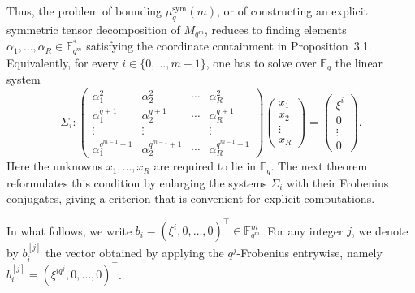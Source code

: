 \documentclass[11pt,a4paper,reqno]{article}
\numberwithin{equation}{section}
\theoremstyle{definition}
\begin{document}
Thus, the problem of bounding \(\mu_q^{\mathrm{sym}}(m)\), or of constructing an
explicit symmetric tensor decomposition of \(M_{q^m}\), reduces to finding elements
\(\alpha_1,\ldots,\alpha_R\in\mathbb F_{q^m}^{*}\) satisfying the coordinate
containment in Proposition~3.1. Equivalently, for every \(i\in\{0,\ldots,m-1\}\), one has to solve over
\(\mathbb F_q\) the linear system
\[
\Sigma_i \colon
\begin{pmatrix}
\alpha_1^2 & \alpha_2^2 & \cdots & \alpha_R^{2} \\
\alpha_1^{q+1} & \alpha_2^{q+1} & \cdots & \alpha_R^{q+1} \\
\vdots & \vdots & & \vdots \\
\alpha_1^{q^{m-1}+1} & \alpha_2^{q^{m-1}+1} & \cdots & \alpha_R^{q^{m-1}+1}
\end{pmatrix}
\begin{pmatrix}
x_1\\
x_2\\
\vdots\\
x_R
\end{pmatrix}
=
\begin{pmatrix}
\xi^i\\
0\\
\vdots\\
0
\end{pmatrix}.
\]
Here the unknowns \(x_1,\ldots,x_R\) are required to lie in \(\mathbb F_q\).
The next theorem reformulates this condition by enlarging the systems
\(\Sigma_i\) with their Frobenius conjugates, giving a criterion that is
convenient for explicit computations.

In what follows, we write $b_i=(\xi^i,0,\ldots,0)^{\top}\in \mathbb F_{q^m}^m$. For any integer \(j\), we denote by \(b_i^{[j]}\) the vector obtained by applying the \(q^j\)-Frobenius entrywise, namely $b_i^{[j]}=(\xi^{i q^j},0,\ldots,0)^{\top}$.
\end{document}
